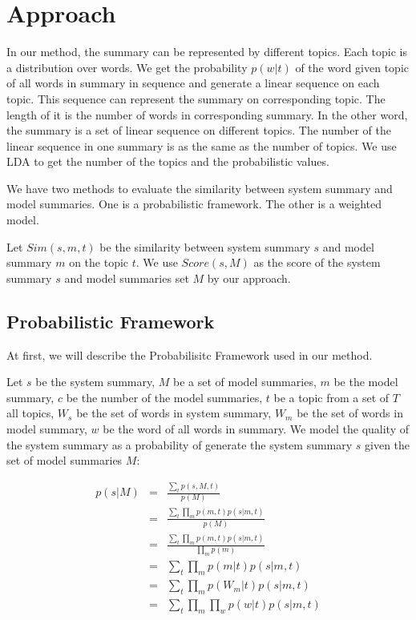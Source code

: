 \section{Approach}
\label{sec:approach}


In our method, the summary can be represented by different topics. Each topic 
is a distribution over words. We get the probability $p(w|t)$ of the word 
given topic of all words in summary in sequence and generate a linear sequence 
on each topic. This sequence can represent the summary on corresponding topic. 
The length of it is the number of words in corresponding summary. In the other word, 
the summary is a set of linear sequence on different topics. The number of the 
linear sequence in one summary is as the same as the number of topics. We use 
LDA to get the number of the topics and the probabilistic values. 

We have two methods to evaluate the similarity between system summary 
and model summaries. One is a probabilistic framework. The other is 
a weighted model.

Let $Sim(s,m,t)$ be the similarity between system summary 
$s$ and model summary $m$ on the topic $t$. We use $Score(s,M)$ as the score of the
system summary $s$ and model summaries set $M$ by our approach.

\subsection{Probabilistic Framework}

At first, we will describe the Probabilisitc Framework used in our method.

Let $s$ be the system summary, $M$ be a set of model summaries, $m$ be the model 
summary, $c$ be the number of the model summaries, $t$ be a topic from 
a set of $T$ all topics, $W_{s}$ be the set of words in system summary, 
$W_{m}$ be the set of words in model summary, $w$ be the word of all words in summary.
We model the quality of the system summary as a probability of generate the system 
summary $s$ given the set of model summaries $M$:

\begin{eqnarray*}
p(s | M) &=& \frac{\sum_t p(s, M, t)}{p(M)} \\
	&=& \frac{\sum_t\prod_m p(m, t) p(s | m, t)}{p(M)} \\
	&=& \frac{\sum_t\prod_m p(m, t) p(s | m, t)}{\prod_m p(m)} \\
	&=& {\sum_t\prod_m p(m | t) p(s | m, t)} \\
	&=& {\sum_t\prod_m p(W_{m} | t) p(s | m, t)} \\
        &=& {\sum_t\prod_m\prod_w p(w | t) p(s | m, t)}\\
\end{eqnarray*}


